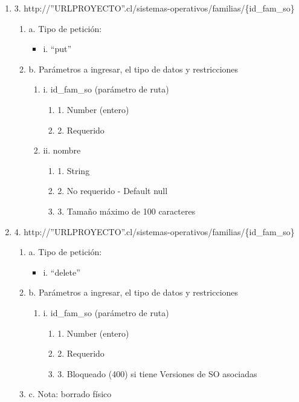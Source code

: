 \begin{enumerate}
    \item 3. http://”URLPROYECTO”.cl/sistemas-operativos/familias/\{id\_fam\_so\}
    \begin{enumerate}
        \item a. Tipo de petición:
            \begin{itemize}
               \item i. “put”
            \end{itemize}
        \item b. Parámetros a ingresar, el tipo de datos y restricciones
            \begin{enumerate}
                \item i. id\_fam\_so (parámetro de ruta)
                    \begin{enumerate}
                        \item 1. Number (entero)
                        \item 2. Requerido
                    \end{enumerate}
                \item ii. nombre
                    \begin{enumerate}
                        \item 1. String
                        \item 2. No requerido - Default null
                        \item 3. Tamaño máximo de 100 caracteres
                    \end{enumerate}
            \end{enumerate}
    \end{enumerate}

    \item 4. http://”URLPROYECTO”.cl/sistemas-operativos/familias/\{id\_fam\_so\}
    \begin{enumerate}
        \item a. Tipo de petición:
            \begin{itemize}
               \item i. “delete”
            \end{itemize}
        \item b. Parámetros a ingresar, el tipo de datos y restricciones
            \begin{enumerate}
                \item i. id\_fam\_so (parámetro de ruta)
                    \begin{enumerate}
                        \item 1. Number (entero)
                        \item 2. Requerido
                        \item 3. Bloqueado (400) si tiene Versiones de SO asociadas
                    \end{enumerate}
            \end{enumerate}
        \item c. Nota: borrado físico
    \end{enumerate}
\end{enumerate}


